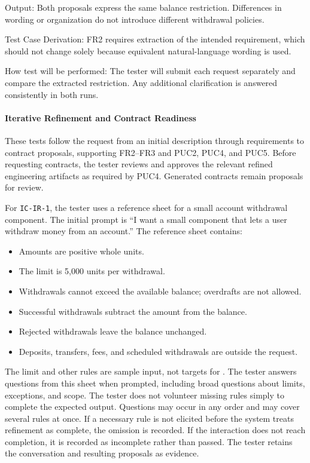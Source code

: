 \documentclass[12pt, titlepage]{article}
\begin{document}
\begin{enumerate}
Output: Both proposals express the same balance restriction. Differences in
wording or organization do not introduce different withdrawal policies.

Test Case Derivation: FR2 requires extraction of the intended requirement,
which should not change solely because equivalent natural-language wording is
used.

How test will be performed: The tester will submit each request separately and
compare the extracted restriction. Any additional clarification is answered
consistently in both runs.

\end{enumerate}

\paragraph{Iterative Refinement and Contract Readiness}

These tests follow the request from an initial description through requirements
to contract proposals, supporting FR2--FR3 and PUC2, PUC4, and PUC5. Before requesting
contracts, the tester reviews and approves the relevant refined engineering
artifacts as required by PUC4. Generated contracts remain proposals for review.

For \texttt{IC-IR-1}, the tester uses a reference sheet for a small account
withdrawal component. The initial prompt is ``I want a small component that
lets a user withdraw money from an account.'' The reference sheet contains:
\begin{itemize}
  \item Amounts are positive whole units.
  \item The limit is 5,000 units per withdrawal.
  \item Withdrawals cannot exceed the available balance; overdrafts are not allowed.
  \item Successful withdrawals subtract the amount from the balance.
  \item Rejected withdrawals leave the balance unchanged.
  \item Deposits, transfers, fees, and scheduled withdrawals are outside the request.
\end{itemize}
The limit and other rules are sample input, not targets for \progname{}.
The tester answers questions from this sheet when prompted, including broad
questions about limits, exceptions, and scope. The tester does not volunteer
missing rules simply to complete the expected output. Questions may occur in
any order and may cover several rules at once. If a necessary rule is not
elicited before the system treats refinement as complete, the omission is
recorded. If the interaction does not reach completion, it is recorded as
incomplete rather than passed. The tester retains the conversation and
resulting proposals as evidence.
\end{document}

